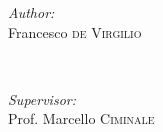 \begin{titlepage}
        \begin{minipage}{0.4\textwidth}
            \begin{flushleft} \normalsize
                \emph{Author:}\\
                Francesco \textsc{de Virgilio} %
            \end{flushleft}
        \end{minipage}
        ~
        \begin{minipage}{0.4\textwidth}
            \begin{flushright} \normalsize
                \emph{Supervisor:} \\
                Prof. Marcello \textsc{Ciminale} %
            \end{flushright}
        \end{minipage}\\[4cm]





         

        \vfill %

    \end{titlepage}

